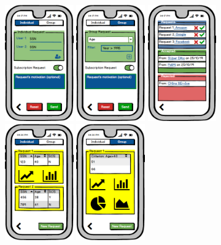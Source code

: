 \documentclass[a4paper]{article}
\begin{document}
        \begin{figure}[!htpb]
    	\centering
    	\includegraphics[height=50mm]{images/mockups/Requests.png}
    	\includegraphics[height=50mm]{images/mockups/GroupRequest.png}
    	\includegraphics[height=50mm]{images/mockups/ManageRequests.png}
    	\includegraphics[height=50mm]{images/mockups/ViewData.png}
    	\includegraphics[height=50mm]{images/mockups/ViewData2.png}
        \end{figure}
        
\end{document}
